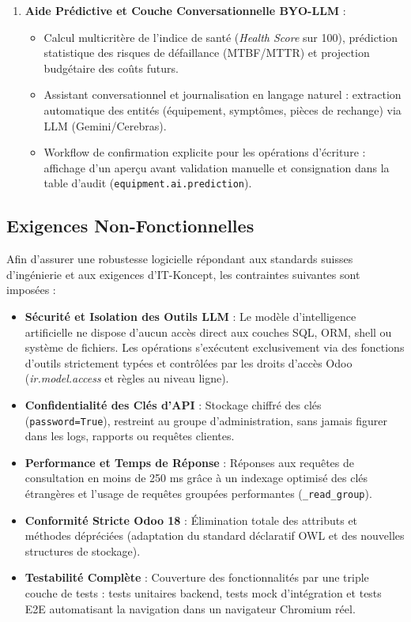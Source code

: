\begin{enumerate}[leftmargin=1.2cm, label=\textbf{EF\arabic*.}]
    \item \textbf{Aide Prédictive et Couche Conversationnelle BYO-LLM} :
    \begin{itemize}
        \item Calcul multicritère de l'indice de santé (\textit{Health Score} sur 100), prédiction statistique des risques de défaillance (MTBF/MTTR) et projection budgétaire des coûts futurs.
        \item Assistant conversationnel et journalisation en langage naturel : extraction automatique des entités (équipement, symptômes, pièces de rechange) via LLM (Gemini/Cerebras).
        \item Workflow de confirmation explicite pour les opérations d'écriture : affichage d'un aperçu avant validation manuelle et consignation dans la table d'audit (\texttt{equipment.ai.prediction}).
    \end{itemize}
\end{enumerate}

\subsection{Exigences Non-Fonctionnelles}
Afin d'assurer une robustesse logicielle répondant aux standards suisses d'ingénierie et aux exigences d'IT-Koncept, les contraintes suivantes sont imposées :

\begin{itemize}[leftmargin=1.5cm, label=\textcolor{odooPurple}{\small\textbullet}]
    \item \textbf{Sécurité et Isolation des Outils LLM} : Le modèle d'intelligence artificielle ne dispose d'aucun accès direct aux couches SQL, ORM, shell ou système de fichiers. Les opérations s'exécutent exclusivement via des fonctions d'outils strictement typées et contrôlées par les droits d'accès Odoo (\textit{ir.model.access} et règles au niveau ligne).
    \item \textbf{Confidentialité des Clés d'API} : Stockage chiffré des clés (\texttt{password=True}), restreint au groupe d'administration, sans jamais figurer dans les logs, rapports ou requêtes clientes.
    \item \textbf{Performance et Temps de Réponse} : Réponses aux requêtes de consultation en moins de 250 ms grâce à un indexage optimisé des clés étrangères et l'usage de requêtes groupées performantes (\texttt{\_read\_group}).
    \item \textbf{Conformité Stricte Odoo 18} : Élimination totale des attributs et méthodes dépréciées (adaptation du standard déclaratif OWL et des nouvelles structures de stockage).
    \item \textbf{Testabilité Complète} : Couverture des fonctionnalités par une triple couche de tests : tests unitaires backend, tests mock d'intégration et tests E2E automatisant la navigation dans un navigateur Chromium réel.
\end{itemize}

